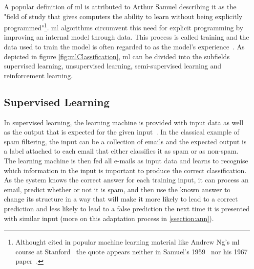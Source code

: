 \documentclass[
			   fontsize=11pt,
               paper=a4,
               bibliography=totoc,
               idxtotoc,
               headsepline,
               footsepline,
               footinclude=false,
               BCOR=12mm,
               DIV=13,
               openany,   %
               ]
               {scrbook}
\begin{document}
A popular definition of \acrlong{ml} is attributed to Arthur Samuel describing it as the "field of study that gives computers the ability to learn without being explicitly programmed"\footnote{Althought cited in popular machine learning material like Andrew Ng's \gls{ml} course at Stanford~\cite{mlCourseStan} the quote appears neither in Samuel's 1959~\cite{mlQuote1959} nor his 1967 paper~\cite{mlQuote1967}.}. \acrlong{ml} algorithms circumvent this need for explicit programming by improving an internal model through data. This process is called training and the data used to train the model is often regarded to as the model's experience~\cite{mlMitchell}. As depicted in figure \autoref{fig:mlClassification}, \gls{ml} can be divided into the subfields supervised learning, unsupervised learning, semi-supervised learning and reinforcement learning.

\subsection{Supervised Learning}
In supervised learning, the learning machine is provided with input data as well as the output that is expected for the given input~\cite{introSupervised}. In the classical example of spam filtering, the input can be a collection of emails and the expected output is a label attached to each email that either classifies it as spam or as non-spam. The learning machine is then fed all e-mails as input data and learns to recognise which information in the input is important to produce the correct classification. As the system knows the correct answer for each training input, it can process an email, predict whether or not it is spam, and then use the known answer to change its structure in a way that will make it more likely to lead to a correct prediction and less likely to lead to a false prediction the next time it is presented with similar input (more on this adaptation process in \autoref{ssection:ann}).
\end{document}
